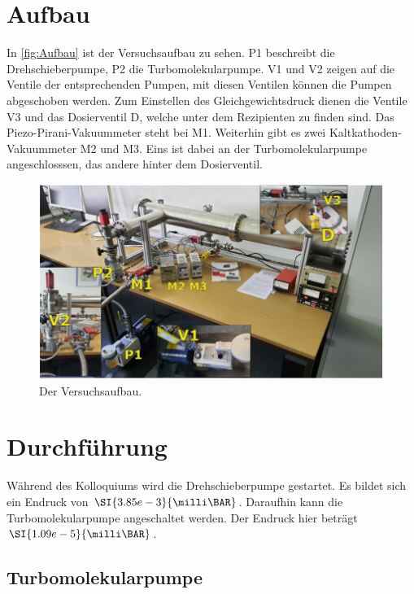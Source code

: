     \section{Aufbau}
        In \autoref{fig:Aufbau} ist der Versuchsaufbau zu sehen.
        P1 beschreibt die Drehschieberpumpe, P2 die Turbomolekularpumpe.
        V1 und V2 zeigen auf die Ventile der entsprechenden Pumpen, mit diesen Ventilen können die Pumpen abgeschoben werden.
        Zum Einstellen des Gleichgewichtsdruck dienen die Ventile V3 und das Dosierventil D, welche unter dem Rezipienten zu finden sind.
        Das Piezo-Pirani-Vakuummeter steht bei M1.
        Weiterhin gibt es zwei Kaltkathoden-Vakuummeter M2 und M3.
        Eins ist dabei an der Turbomolekularpumpe angeschlosssen, das andere hinter dem Dosierventil.

        \begin{figure}[H]
            \centering
            \includegraphics[width=\textwidth]{bilder/Aufbau.png}
            \caption{Der Versuchsaufbau.\cite{anleitung}}
            \label{fig:Aufbau}
        \end{figure}

    \section{Durchführung}
    \label{sec:Durchführung}
        Während des Kolloquiums wird die Drehschieberpumpe gestartet.
        Es bildet sich ein Endruck von $\SI{3.85e-3}{\milli\BAR}$.
        Daraufhin kann die Turbomolekularpumpe angeschaltet werden.
        Der Endruck hier beträgt $\SI{1.09e-5}{\milli\BAR}$.

        \subsection{Turbomolekularpumpe}
